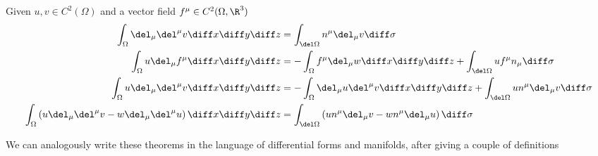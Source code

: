 \documentclass[../mmf.tex]{subfiles}
\begin{document}
\begin{thm}
	Given $u,v\in C^2(\Omega)$ and a vector field $f^\mu\in C^2(\Omega,\R^3)$
	\begin{equation}
		\begin{aligned}
			\int_{\Omega}\del_\mu\del^\mu v\diff x\diff y\diff z&=\int_{\del\Omega}n^\mu\del_\mu v\diff\sigma\\
			\int_\Omega u\del_\mu f^\mu\diff x\diff y\diff z&=-\int_\Omega f^\mu\del_\mu w\diff x\diff y\diff z+\int_{\del\Omega}uf^\mu n_\mu\diff\sigma\\
			\int_\Omega u\del_\mu\del^\mu v\diff x\diff y\diff z&=-\int_\Omega \del_\mu u\del^\mu v\diff x\diff y\diff z+\int_{\del\Omega}un^\mu\del_\mu v\diff\sigma\\
			\int_{\Omega}\left( u\del_\mu\del^\mu v-w\del_\mu\del^\mu u \right)\diff x\diff y\diff z&=\int_{\del\Omega}\left( un^\mu\del_\mu v-wn^\mu\del_\mu u \right)\diff\sigma
		\end{aligned}
		\label{eq:usefulidinthm}
	\end{equation}
\end{thm}
We can analogously write these theorems in the language of differential forms and manifolds, after giving a couple of definitions
\end{document}
